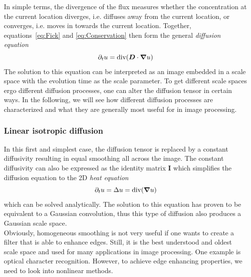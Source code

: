 In simple terms, the divergence of the flux measures whether the concentration at the current
location diverges, i.e. diffuses away from the current location, or converges, i.e. moves in
towards the current location.
Together, equations~\eqref{eq:Fick} and \eqref{eq:Conservation} then form the general \textit{diffusion
    equation}\cite{dic18-02, weickert96}
\begin{equation}
    \partial_t u = \textnormal{div}(\boldsymbol D\cdot\boldsymbol\nabla u)\label{eq:Diffusion}
\end{equation}
The solution to this equation can be interpreted as an image embedded in a scale space with the
evolution time as the scale parameter. To get different scale spaces ergo different diffusion
processes, one can alter the diffusion tensor in certain ways.
In the following, we will see how different diffusion processes are characterized and what they are
generally most useful for in image processing.

\subsubsection*{Linear isotropic diffusion}
In this first and simplest case, the diffusion tensor is replaced by a constant diffusivity
resulting in equal smoothing all across the image. The constant diffusivity can also be expressed
as the identity matrix $\boldsymbol I$ which simplifies the diffusion equation to the 2D\textit{
heat equation}
\begin{equation}
    \partial_t u = \Delta u = \textnormal{div}(\boldsymbol\nabla u)
\end{equation}
which can be solved analytically. The solution to this equation has proven to be equivalent to
a Gaussian convolution, thus this type of diffusion also produces a Gaussian scale space.\\
Obviously, homogeneous smoothing is not very useful if one wants to create a filter that is able to
enhance edges. Still, it is the best understood and oldest scale space and used for many
applications in image processing. One example is optical character recognition.
However, to achieve edge enhancing properties, we need to look into nonlinear methods.

